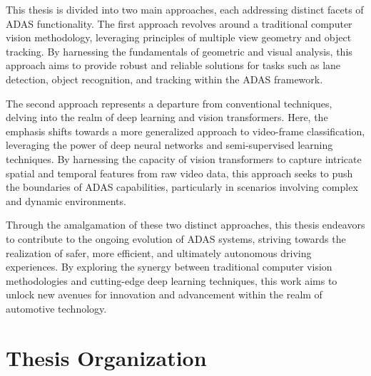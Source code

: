 This thesis is divided into two main approaches, each addressing distinct facets of ADAS functionality. The first approach revolves around a traditional computer vision methodology, leveraging principles of multiple view geometry and object tracking. By harnessing the fundamentals of geometric and visual analysis, this approach aims to provide robust and reliable solutions for tasks such as lane detection, object recognition, and tracking within the ADAS framework.

The second approach represents a departure from conventional techniques, delving into the realm of deep learning and vision transformers. Here, the emphasis shifts towards a more generalized approach to video-frame classification, leveraging the power of deep neural networks and semi-supervised learning techniques. By harnessing the capacity of vision transformers to capture intricate spatial and temporal features from raw video data, this approach seeks to push the boundaries of ADAS capabilities, particularly in scenarios involving complex and dynamic environments.

Through the amalgamation of these two distinct approaches, this thesis endeavors to contribute to the ongoing evolution of ADAS systems, striving towards the realization of safer, more efficient, and ultimately autonomous driving experiences. By exploring the synergy between traditional computer vision methodologies and cutting-edge deep learning techniques, this work aims to unlock new avenues for innovation and advancement within the realm of automotive technology.


\section{Thesis Organization}
